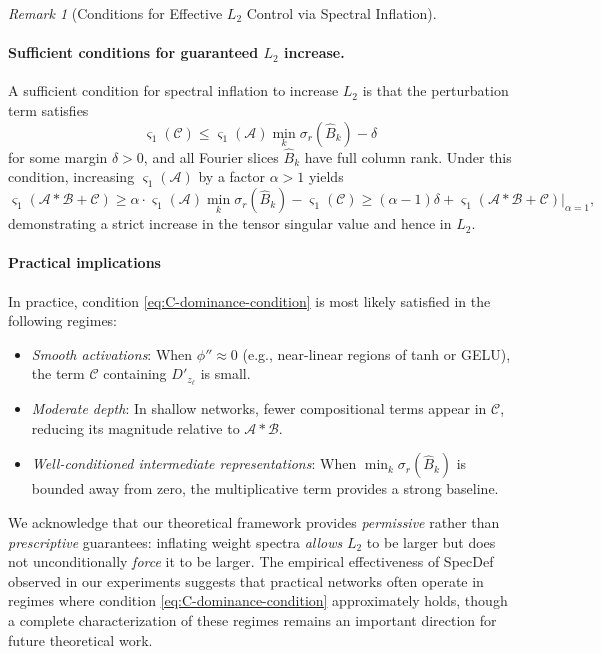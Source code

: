 \documentclass{article}
\theoremstyle{plain}
\theoremstyle{definition}
\theoremstyle{remark}
\newtheorem{remark}[theorem]{Remark}
\begin{document}
\begin{remark}[Conditions for Effective $L_2$ Control via Spectral Inflation]
\paragraph{Sufficient conditions for guaranteed $L_2$ increase.}
A sufficient condition for spectral inflation to increase $L_2$ is that 
the perturbation term satisfies
\begin{equation}
\label{eq:C-dominance-condition}
\varsigma_1(\mathcal{C}) \le 
\varsigma_1(\mathcal{A})\min_{k}\sigma_r(\widehat{B}_k) - \delta
\end{equation}
for some margin $\delta > 0$, and all Fourier slices $\widehat{B}_k$ 
have full column rank. Under this condition, increasing 
$\varsigma_1(\mathcal{A})$ by a factor $\alpha > 1$ yields
\[
\varsigma_1(\mathcal{A} * \mathcal{B} + \mathcal{C}) 
\ge \alpha \cdot \varsigma_1(\mathcal{A})\min_k \sigma_r(\widehat{B}_k) 
- \varsigma_1(\mathcal{C})
\ge (\alpha - 1)\delta + \varsigma_1(\mathcal{A}*\mathcal{B}+\mathcal{C})\big|_{\alpha=1},
\]
demonstrating a strict increase in the tensor singular value and hence in $L_2$.

\paragraph{Practical implications}
In practice, condition \eqref{eq:C-dominance-condition} is most likely 
satisfied in the following regimes:
\begin{itemize}[leftmargin=2em]
    \item \emph{Smooth activations}: When $\phi'' \approx 0$ 
    (e.g., near-linear regions of tanh or GELU), the term $\mathcal{C}$ 
    containing $D'_{z_\ell}$ is small.
    \item \emph{Moderate depth}: In shallow networks, fewer compositional 
    terms appear in $\mathcal{C}$, reducing its magnitude relative to 
    $\mathcal{A} * \mathcal{B}$.
    \item \emph{Well-conditioned intermediate representations}: When 
    $\min_k \sigma_r(\widehat{B}_k)$ is bounded away from zero, the 
    multiplicative term provides a strong baseline.
\end{itemize}

We acknowledge that our theoretical framework provides \emph{permissive} 
rather than \emph{prescriptive} guarantees: inflating weight spectra 
\emph{allows} $L_2$ to be larger but does not unconditionally \emph{force} 
it to be larger. The empirical effectiveness of SpecDef observed in our 
experiments suggests that practical networks often operate in regimes 
where condition \eqref{eq:C-dominance-condition} approximately holds, 
though a complete characterization of these regimes remains an important 
direction for future theoretical work.
\end{remark}


\end{document}
